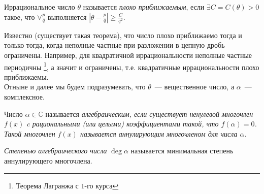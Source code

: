 \begin{definition}
	Иррациональное число $\theta$ называется \textit{плохо приближаемым}, если $\exists C = C(\theta) > 0$ такое, что $\forall \frac{p}{q}$ выполняется $\displaystyle \left| \theta - \frac{p}{q} \right| \geq \frac{C}{q^2}$.
\end{definition}

Известно (существует такая теорема), что число плохо приближаемо тогда и только тогда, когда неполные частные при разложении в цепную дробь ограничены.
Например, для квадратичной иррациональности неполные частные периодичны \footnote{Теорема Лагранжа с $1$-го курса}, а значит и ограничены, т.е. квадратичные иррациональности плохо приближаемы.\\
Отныне и далее мы будем подразумевать, что $\theta$ — вещественное число, а $\alpha$ — комплексное.

\begin{definition}
	Число $\alpha \in \mathbb{C}$ называется \it{алгебраическим}, если существует ненулевой многочлен $f(x)$ c рациональными (или целыми) коэффициентами такой, что $f(\alpha) = 0$. Такой многочлен $f(x)$ называется аннулирующим многочленом для числа $\alpha$.
\end{definition}

\begin{definition}
	\textit{Степенью алгебраического числа} $\deg \alpha$ называется минимальная степень аннулирующего многочлена.
\end{definition}

